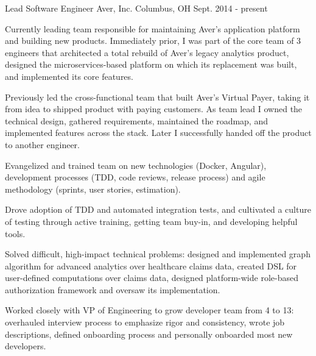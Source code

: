

\begin{cventries}

  \cventry
    {Lead Software Engineer} %
    {Aver, Inc.} %
    {Columbus, OH} %
    {Sept. 2014 - present} %
    {
      \begin{cvitems} %
        \item {Currently leading team responsible for maintaining Aver's application platform and building new products. Immediately prior, I was part of the core team of 3 engineers that architected a total rebuild of Aver's legacy analytics product, designed the microservices-based platform on which its replacement was built, and implemented its core features.}
        \item {Previously led the cross-functional team that built Aver's Virtual Payer, taking it from idea to shipped product with paying customers. As team lead I owned the technical design, gathered requirements, maintained the roadmap, and implemented features across the stack. Later I successfully handed off the product to another engineer.}
        \item {Evangelized and trained team on new technologies (Docker, Angular), development processes (TDD, code reviews, release process) and agile methodology (sprints, user stories, estimation).}
        \item {Drove adoption of TDD and automated integration tests, and cultivated a culture of testing through active training, getting team buy-in, and developing helpful tools. }
        \item {Solved difficult, high-impact technical problems: designed and implemented graph algorithm for advanced analytics over healthcare claims data, created DSL for user-defined computations over claims data, designed platform-wide role-based authorization framework and oversaw its implementation.}
        \item {Worked closely with VP of Engineering to grow developer team from 4 to 13: overhauled interview process to emphasize rigor and consistency, wrote job descriptions, defined onboarding process and personally onboarded most new developers.}
      \end{cvitems}
    }


\end{cventries}

